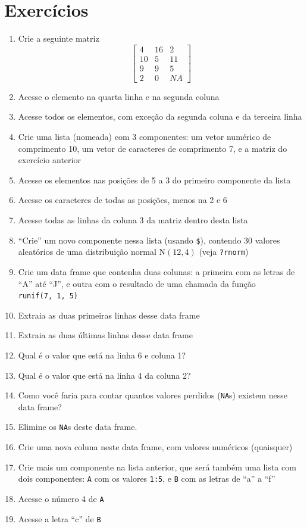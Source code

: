 \documentclass[10pt,a4paper]{book}
\providecommand{\tightlist}{%
  \setlength{\itemsep}{0pt}\setlength{\parskip}{0pt}}
\begin{document}
\section*{Exercícios}\label{exercicios-6}


\begin{enumerate}
\def\labelenumi{\arabic{enumi}.}
\tightlist
\item
  Crie a seguinte matriz \[\left[ \begin{array}{ccc}
          4 & 16 & 2 \\
          10 & 5 & 11 \\
          9 & 9 & 5 \\
          2 & 0 & NA
          \end{array} \right]\]
\item
  Acesse o elemento na quarta linha e na segunda coluna
\item
  Acesse todos os elementos, com exceção da segunda coluna e da terceira
  linha
\item
  Crie uma lista (nomeada) com 3 componentes: um vetor numérico de
  comprimento 10, um vetor de caracteres de comprimento 7, e a matriz do
  exercício anterior
\item
  Acesse os elementos nas posições de 5 a 3 do primeiro componente da
  lista
\item
  Acesse os caracteres de todas as posições, menos na 2 e 6
\item
  Acesse todas as linhas da coluna 3 da matriz dentro desta lista
\item
  ``Crie'' um novo componente nessa lista (usando \texttt{\$}), contendo
  30 valores aleatórios de uma distribuição normal \(\text{N}(12, 4)\)
  (veja \texttt{?rnorm})
\item
  Crie um data frame que contenha duas colunas: a primeira com as letras
  de ``A'' até ``J'', e outra com o resultado de uma chamada da função
  \texttt{runif(7,\ 1,\ 5)}
\item
  Extraia as duas primeiras linhas desse data frame
\item
  Extraia as duas últimas linhas desse data frame
\item
  Qual é o valor que está na linha 6 e coluna 1?
\item
  Qual é o valor que está na linha 4 da coluna 2?
\item
  Como você faria para contar quantos valores perdidos (\texttt{NA}s)
  existem nesse data frame?
\item
  Elimine os \texttt{NA}s deste data frame.
\item
  Crie uma nova coluna neste data frame, com valores numéricos
  (quaisquer)
\item
  Crie mais um componente na lista anterior, que será também uma lista
  com dois componentes: \texttt{A} com os valores \texttt{1:5}, e
  \texttt{B} com as letras de ``a'' a ``f''
\item
  Acesse o número 4 de \texttt{A}
\item
  Acesse a letra ``c'' de \texttt{B}
\end{enumerate}
\end{document}
